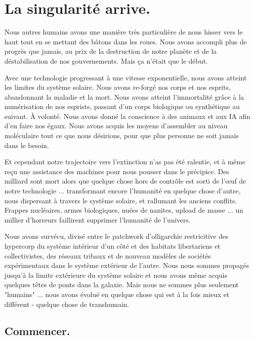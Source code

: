 \chapter{La singularité arrive.} \label{chap:enter-the-singularity} 

Nous autres humains avons une manière très particulière de nous hisser vers le haut tout en se mettant des bâtons dans les roues. Nous avons accompli plus de progrès que jamais, au prix de la destruction de notre planète et de la déstabilisation de nos gouvernements. Mais ça n'était que le début. 

Avec une technologie progressant à une vitesse exponentielle, nous avons atteint les limites du système solaire. Nous avons re-forgé nos corps et nos esprits, abandonnant la maladie et la mort. Nous avons atteint l'immortalité grâce à la numérisation de nos esprists, passant d'un corps biologique ou synthétique au suivant. À volonté. Nous avons donné la conscience à des animaux et aux IA afin d'en faire nos égaux. Nous avons acquis les moyens d'assembler au niveau moléculaire tout ce que nous désirions, pour que plus personne ne soit jamais dans le besoin. 

Et cependant notre trajectoire vers l'extinction n'as pas été ralentie, et à même reçu une assistance des machines pour nous pousser dans le précipice. Des milliard sont mort alors que quelque chose hors de contrôle est sorti de l'œuf de notre technologie ... transformant encore l'humanité en quelque chose d'autre, nous dispersant à travers le système solaire, et rallumant les anciens conflits. Frappes nucléaires, armes biologiques, nuées de nanites, upload de masse ... un millier d'horreurs faillirent supprimer l'humanité de l'univers. 

Nous avons survécu, divisé entre le patchwork d'olligarchie restricitive des hypercorp du système intérieur d'un côté et des habitats libertariens et collectivistes, des réseaux tribaux et de nouveau modèles de sociétés expérimentaux dans le système extérieur de l'autre. Nous nous sommes propagés jusqu'à la limite extérieure du système solaire et nous avons même acquis quelques têtes de ponts dans la galaxie. Mais nous ne sommes plus seulement "humains" ... nous avons évolué en quelque chose qui est à la fois mieux et différent - quelque chose de transhumain. 



\section{Commencer.} \label{sec:starting-out} 

